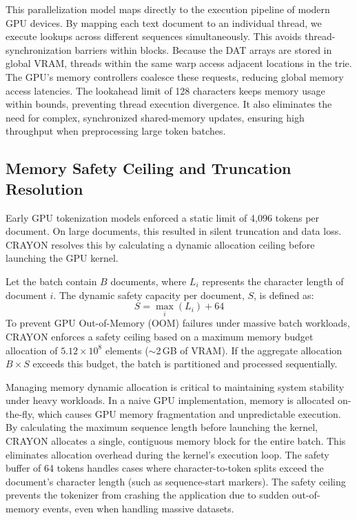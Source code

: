 \documentclass[10pt,journal,compsoc]{IEEEtran}
\begin{document}
This parallelization model maps directly to the execution pipeline of modern GPU devices. By mapping each text document to an individual thread, we execute lookups across different sequences simultaneously. This avoids thread-synchronization barriers within blocks. Because the DAT arrays are stored in global VRAM, threads within the same warp access adjacent locations in the trie. The GPU's memory controllers coalesce these requests, reducing global memory access latencies. The lookahead limit of 128 characters keeps memory usage within bounds, preventing thread execution divergence. It also eliminates the need for complex, synchronized shared-memory updates, ensuring high throughput when preprocessing large token batches.

\subsection{Memory Safety Ceiling and Truncation Resolution}
Early GPU tokenization models enforced a static limit of 4,096 tokens per document. On large documents, this resulted in silent truncation and data loss. CRAYON resolves this by calculating a dynamic allocation ceiling before launching the GPU kernel. 

Let the batch contain $B$ documents, where $L_i$ represents the character length of document $i$. The dynamic safety capacity per document, $S$, is defined as:
\begin{equation}
S = \max_{i} (L_i) + 64
\end{equation}
To prevent GPU Out-of-Memory (OOM) failures under massive batch workloads, CRAYON enforces a safety ceiling based on a maximum memory budget allocation of $5.12 \times 10^8$ elements ($\sim$2\,GB of VRAM). If the aggregate allocation $B \times S$ exceeds this budget, the batch is partitioned and processed sequentially.

Managing memory dynamic allocation is critical to maintaining system stability under heavy workloads. In a naive GPU implementation, memory is allocated on-the-fly, which causes GPU memory fragmentation and unpredictable execution. By calculating the maximum sequence length before launching the kernel, CRAYON allocates a single, contiguous memory block for the entire batch. This eliminates allocation overhead during the kernel's execution loop. The safety buffer of 64 tokens handles cases where character-to-token splits exceed the document's character length (such as sequence-start markers). The safety ceiling prevents the tokenizer from crashing the application due to sudden out-of-memory events, even when handling massive datasets.
\end{document}
